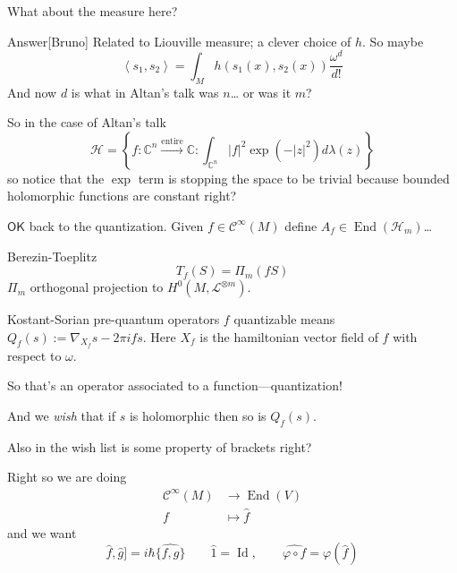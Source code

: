 \begin{question}[Altan]\leavevmode
	What about the measure here?
\end{question}

\begin{thing9}{Answer}[Bruno]\leavevmode
	Related to Liouville measure; a clever choice of $h$. So maybe
	 \[\left<s_1,s_2\right> =\int_{M}h\left( s_1(x),s_2(x) \right) \frac{\omega^d}{d!}\]
	 And now $d$ is what in Altan's talk was  $n$… or was it $m$?
\end{thing9}

\begin{remark}\leavevmode
	So in the case of Altan's talk
	\[\mathcal{H}=\left\{ f:\mathbb{C}^{n}\overset{\operatorname{entire}}{\longrightarrow}\mathbb{C}:\int_{\mathbb{C}^{n}}|f|^2\operatorname{exp}(-|z|^2) d \lambda(z) \right\} \]
	so notice that the $\operatorname{exp}$ term is stopping the space to be trivial because bounded holomorphic functions are constant right?
\end{remark}

$\mathsf{OK}$ back to the quantization. Given $f \in\mathcal{C}^\infty(M)$ define $A_f \in\operatorname{End}(\mathcal{H}_m)$…

\begin{thing4}{Berezin-Toeplitz}\leavevmode
\[T_f(S)=\Pi_m(fS) \]
$\Pi_m$ orthogonal projection to $H^{0}(M,\mathcal{L}^{\otimes m})$.
\end{thing4}

\begin{thing7}{Kostant-Sorian pre-quantum operators}\leavevmode
	$f$ quantizable means $Q_f(s):=\nabla_{X_f}s-2\pi i fs$. Here $X_f$ is the hamiltonian vector field of  $f$ with respect to  $\omega$. 

	So that's an operator associated to a function---quantization!

	And we \textit{wish} that if  $s$ is holomorphic then so is $Q_f(s)$.
\end{thing7}

\begin{remark}[Sergey]\leavevmode
	Also in the wish list is some property of brackets right?
\end{remark}

Right so we are doing
\begin{align*}
	\mathcal{C}^\infty(M) &\longrightarrow \operatorname{End}(V) \\
	f &\longmapsto \hat{f}
\end{align*}
and we want
\[ \hat{f},\hat{g}]=i\hbar \widehat{\{f,g\}}\qquad \hat{1}=\operatorname{Id},\qquad \widehat{\varphi\circ f}=\varphi(\hat{f})\]

